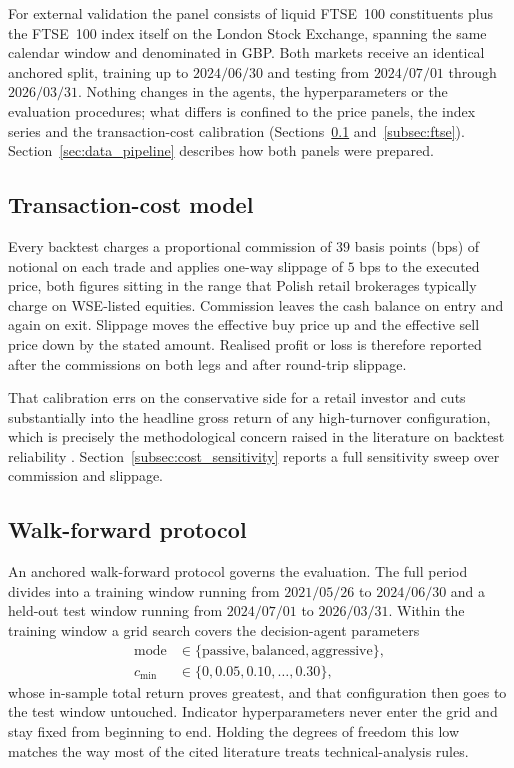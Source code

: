 For external validation the panel consists of \FtseNsymbols{} liquid FTSE~100 constituents plus the FTSE~100 index itself on the London Stock Exchange, spanning the same calendar window and denominated in GBP. Both markets receive an identical anchored split, training up to $2024/06/30$ and testing from $2024/07/01$ through $2026/03/31$. Nothing changes in the agents, the hyperparameters or the evaluation procedures; what differs is confined to the price panels, the index series and the transaction-cost calibration (Sections~\ref{subsec:costs} and~\ref{subsec:ftse}). Section~\ref{sec:data_pipeline} describes how both panels were prepared.

\subsection{Transaction-cost model}\label{subsec:costs}

Every backtest charges a proportional commission of $39$ basis points (bps) of notional on each trade and applies one-way slippage of $5$ bps to the executed price, both figures sitting in the range that Polish retail brokerages typically charge on WSE-listed equities. Commission leaves the cash balance on entry and again on exit. Slippage moves the effective buy price up and the effective sell price down by the stated amount. Realised profit or loss is therefore reported after the commissions on both legs and after round-trip slippage.

That calibration errs on the conservative side for a retail investor and cuts substantially into the headline gross return of any high-turnover configuration, which is precisely the methodological concern raised in the literature on backtest reliability \cite{bailey2014}. Section~\ref{subsec:cost_sensitivity} reports a full sensitivity sweep over commission and slippage.

\subsection{Walk-forward protocol}\label{subsec:walkforward}

An anchored walk-forward protocol governs the evaluation. The full period divides into a training window running from $2021/05/26$ to $2024/06/30$ and a held-out test window running from $2024/07/01$ to $2026/03/31$. Within the training window a grid search covers the decision-agent parameters
\begin{equation}
\begin{aligned}
\mathrm{mode} &\in \{\text{passive}, \text{balanced}, \text{aggressive}\}, \\
c_{\min} &\in \{0, 0.05, 0.10, \ldots, 0.30\},
\end{aligned}
\label{eq:wf_grid}
\end{equation}
whose in-sample total return proves greatest, and that configuration then goes to the test window untouched. Indicator hyperparameters never enter the grid and stay fixed from beginning to end. Holding the degrees of freedom this low matches the way most of the cited literature treats technical-analysis rules.


